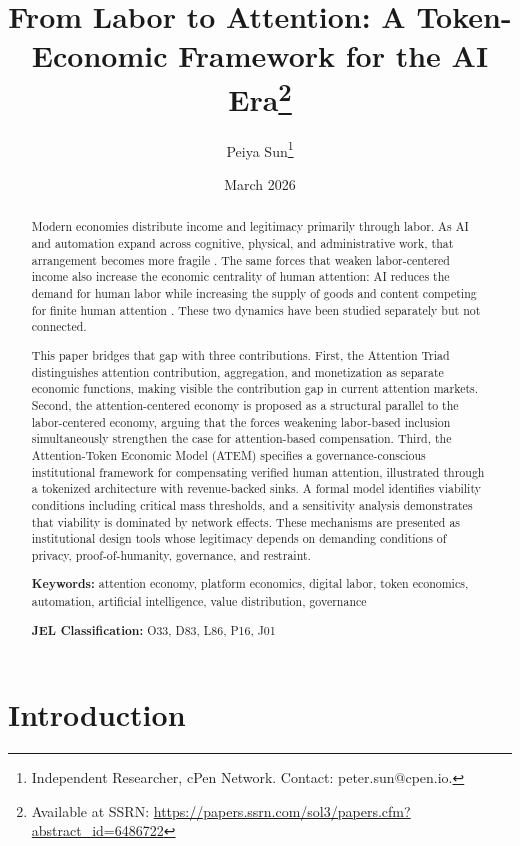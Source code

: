 \documentclass[12pt, a4paper]{article}
\title{\textbf{From Labor to Attention: A Token-Economic Framework for the AI Era}\thanks{Available at SSRN: \url{https://papers.ssrn.com/sol3/papers.cfm?abstract_id=6486722}}}
\author{Peiya Sun\thanks{Independent Researcher, cPen Network. Contact: peter.sun@cpen.io.}}
\date{March 2026}
\begin{document}
\maketitle

\begin{abstract}
\noindent
Modern economies distribute income and legitimacy primarily through labor. As AI and automation expand across cognitive, physical, and administrative work, that arrangement becomes more fragile \citep{frey2017, acemoglu2025, eloundou2024}. The same forces that weaken labor-centered income also increase the economic centrality of human attention: AI reduces the demand for human labor while increasing the supply of goods and content competing for finite human attention \citep{simon1971, goldhaber1997}. These two dynamics have been studied separately but not connected.

This paper bridges that gap with three contributions. First, the Attention Triad distinguishes attention contribution, aggregation, and monetization as separate economic functions, making visible the contribution gap in current attention markets. Second, the attention-centered economy is proposed as a structural parallel to the labor-centered economy, arguing that the forces weakening labor-based inclusion simultaneously strengthen the case for attention-based compensation. Third, the Attention-Token Economic Model (ATEM) specifies a governance-conscious institutional framework for compensating verified human attention, illustrated through a tokenized architecture with revenue-backed sinks. A formal model identifies viability conditions including critical mass thresholds, and a sensitivity analysis demonstrates that viability is dominated by network effects. These mechanisms are presented as institutional design tools whose legitimacy depends on demanding conditions of privacy, proof-of-humanity, governance, and restraint.

\medskip
\noindent\textbf{Keywords:} attention economy, platform economics, digital labor, token economics, automation, artificial intelligence, value distribution, governance

\medskip
\noindent\textbf{JEL Classification:} O33, D83, L86, P16, J01
\end{abstract}

\newpage
\tableofcontents
\newpage

\section{Introduction}
\label{sec:introduction}
\end{document}
